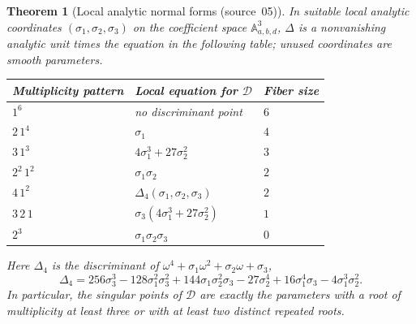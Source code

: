 \documentclass[11pt,a4paper]{article}
\newtheorem{theorem}{Theorem}[section]
\theoremstyle{definition}
\newcommand{\A}{\mathbb A}
\newcommand{\dd}{\mathcal D}
\newcommand{\src}[1]{\textup{(source~#1)}}
\begin{document}
\begin{theorem}[Local analytic normal forms \src{05}]\label{f6:kf:thm:localtypes}
In suitable local analytic coordinates $(\sigma_1,\sigma_2,\sigma_3)$ on the
coefficient space $\A^3_{a,b,d}$, $\Delta$ is a nonvanishing analytic unit
times the equation in the following table; unused coordinates are smooth
parameters.
\begin{center}
\renewcommand{\arraystretch}{1.25}
\begin{tabular}{@{}lll@{}}
\toprule
Multiplicity pattern & Local equation for $\dd$ & Fiber size\\
\midrule
$1^6$ & no discriminant point & $6$\\
$2\,1^4$ & $\sigma_1$ & $4$\\
$3\,1^3$ & $4\sigma_1^3+27\sigma_2^2$ & $3$\\
$2^2\,1^2$ & $\sigma_1\sigma_2$ & $2$\\
$4\,1^2$ & $\Delta_4(\sigma_1,\sigma_2,\sigma_3)$ & $2$\\
$3\,2\,1$ & $\sigma_3(4\sigma_1^3+27\sigma_2^2)$ & $1$\\
$2^3$ & $\sigma_1\sigma_2\sigma_3$ & $0$\\
\bottomrule
\end{tabular}
\end{center}
Here $\Delta_4$ is the discriminant of $\omega^4+\sigma_1\omega^2+\sigma_2\omega+\sigma_3$,
\begin{equation}\label{f6:kf:eq:quarticdisc}
\Delta_4=256\sigma_3^3-128\sigma_1^2\sigma_3^2+144\sigma_1\sigma_2^2\sigma_3
 -27\sigma_2^4+16\sigma_1^4\sigma_3-4\sigma_1^3\sigma_2^2 .
\end{equation}
In particular, the singular points of $\dd$ are exactly the parameters with a
root of multiplicity at least three or with at least two distinct repeated
roots.
\end{theorem}
\end{document}
